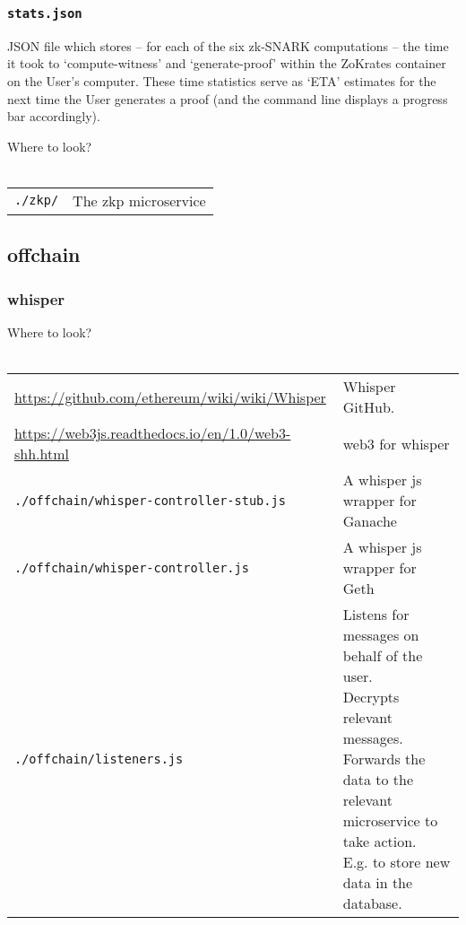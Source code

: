 \documentclass{article}
\begin{document}
\subsubsection{\texttt{stats.json}}
JSON file which stores -- for each of the six zk-SNARK computations -- the time it took to `compute-witness' and `generate-proof' within the ZoKrates container on the User's computer. These time statistics serve as `ETA' estimates for the next time the User generates a proof (and the command line displays a progress bar accordingly).

\begin{center}
  \begin{mdframed}[backgroundcolor=verylightblue]
    Where to look?\\
    \\
    \begin{tabular}{lp{14cm}}
      \texttt{./zkp/} & The zkp microservice\\
    \end{tabular}
  \end{mdframed}
\end{center}


\subsection{offchain}
\label{sec:offchain}

\subsubsection{whisper}
\label{sec:whisper}

\begin{center}
  \begin{mdframed}[backgroundcolor=verylightblue]
    Where to look?\\
    \\
    \begin{tabular}{lp{14cm}}
      \url{https://github.com/ethereum/wiki/wiki/Whisper} & Whisper GitHub.\\
      \url{https://web3js.readthedocs.io/en/1.0/web3-shh.html} & web3 for whisper\\
      \texttt{./offchain/whisper-controller-stub.js} & A whisper js wrapper for Ganache\\
      \texttt{./offchain/whisper-controller.js} & A whisper js wrapper for Geth\\
      \texttt{./offchain/listeners.js} & \makecell[lt]{Listens for messages on behalf of the user.\\
      Decrypts relevant messages.\\
      Forwards the data to the relevant microservice to\\
      take action.\\
      E.g. to store new data in the database.}\\
    \end{tabular}
  \end{mdframed}
\end{center}
\end{document}
